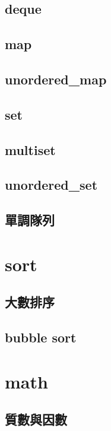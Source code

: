     \subsection{deque}
        
    \subsection{map}
        
    \subsection{unordered\_map}
        
    \subsection{set}
        
    \subsection{multiset}
        
    \subsection{unordered\_set}
        
    \subsection{單調隊列}
        

\section{sort}
    \subsection{大數排序}
        
    \subsection{bubble sort}
        

\section{math}
        \subsection{質數與因數}
            
